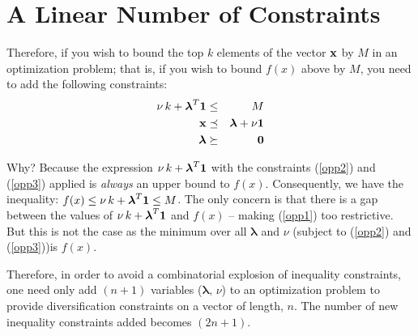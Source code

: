\documentclass[12pt]{article}
\begin{document}
\section{A Linear Number of Constraints}
Therefore, if you wish to bound the top $k$ elements of the vector ${\bf x}$ by $M$ in an optimization problem; that is,
if you wish to bound $f(x)$ above by $M$, you 
need to add the following constraints:
\begin{eqnarray}
	\nu \, k + {\boldsymbol \lambda}^T {\bf 1}  & \le & M \label{opp1} \\ 
	{\bf x} & \preceq & {\boldsymbol \lambda} + \nu {\bf 1} \label{opp2} \\
	{\boldsymbol \lambda} & \succeq & {\bf 0}  \label{opp3}
\end{eqnarray}

Why? Because the expression $\nu \, k + {\boldsymbol \lambda}^T {\bf 1}$ with
the constraints (\ref{opp2}) and (\ref{opp3}) applied is {\it always\/} an upper bound to $f(x)$. 
Consequently, we have the inequality: $f(x) \le \nu \, k + {\boldsymbol \lambda}^T {\bf 1} \le M$.
The only concern is that there is a gap between the values of $\nu \, k + {\boldsymbol \lambda}^T {\bf 1}$ 
and $f(x)$ -- making (\ref{opp1}) too restrictive. 
But this is not the case as the minimum over all ${\boldsymbol \lambda}$ 
and $\nu$ (subject to (\ref{opp2}) and (\ref{opp3}))is $f(x)$.

Therefore, in order to avoid a combinatorial explosion of inequality constraints, 
one need only add $(n+1)$ variables (${\boldsymbol \lambda}, \, \nu$) to an optimization problem 
to provide diversification constraints on a vector of length, $n$.
The number of new inequality constraints added becomes $(2n+1)$.
\end{document}
